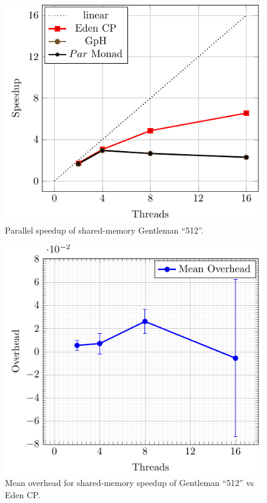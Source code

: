\documentclass[paper=A4,twoside=true,openright,parskip=full,chapterprefix=true,headings=normal,bibliography=totoc,listof=totoc,titlepage=on,captions=tableabove,draft=false,british]{scrreprt}%
\renewcommand{\enquote}[1]{{``}#1{''}}
\begin{document}
\begin{figure}[h]
\centering
\includegraphics{src/img/perfSMTorus.pdf}
\caption{Parallel speedup of shared-memory Gentleman
\enquote{512}.\label{fig:perfSMTorus}}
\end{figure}

\begin{figure}[h]
\centering
\includegraphics{src/img/overSMTorusEden.pdf}
\caption{Mean overhead for shared-memory speedup of Gentleman
\enquote{512} vs Eden CP.\label{fig:overSMTorusEden}}
\end{figure}
\end{document}
